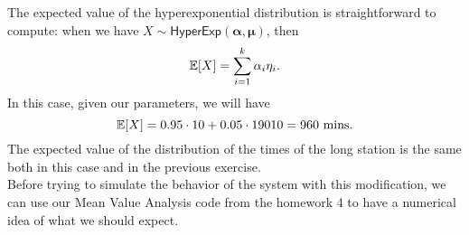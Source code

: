 \documentclass[12pt]{article}
\begin{document}
The expected value of the hyperexponential distribution is straightforward to compute: when we have $X\sim\mathsf{HyperExp}(\mathbf{\alpha},\mathbf{\mu})$, then
\begin{equation*}
	\mathbb{E}[X]=\sum_{i=1}^{k}\alpha_i\eta_i.
\end{equation*}
In this case, given our parameters, we will have
\begin{equation*}
	\mathbb{E}[X]=0.95\cdot 10+0.05\cdot19010=960\text{ mins}.
\end{equation*}
The expected value of the distribution of the times of the long station is the same both in this case and in the previous exercise. \\
Before trying to simulate the behavior of the system with this modification, we can use our Mean Value Analysis code from the homework 4 to have a numerical idea of what we should expect. 
\end{document}
